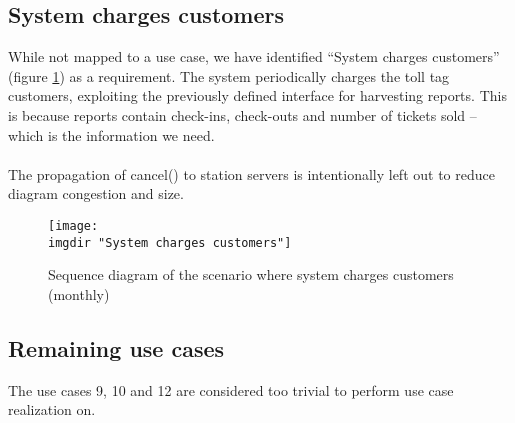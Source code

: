 \subsection{System charges customers}
While not mapped to a use case, we have identified ``System charges customers'' (figure \ref{fig:seq_diag:system_charges_customers}) as a requirement. The system periodically charges the toll tag customers, exploiting the previously defined interface for harvesting reports. This is because reports contain check-ins, check-outs and number of tickets sold -- which is the information we need.\\\\
The propagation of cancel() to station servers is intentionally left out to reduce diagram congestion and size.
\begin{figure}
  \texttt{[image: \\imgdir "System charges customers"]}
  \caption{Sequence diagram of the scenario where system charges customers (monthly)}
  \label{fig:seq_diag:system_charges_customers}
\end{figure}

\subsection{Remaining use cases}
The use cases 9, 10 and 12 are considered too trivial to perform use case realization on.